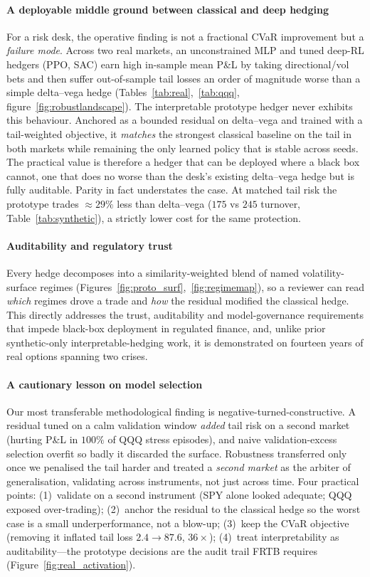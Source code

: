 \documentclass[sigconf,anonymous]{acmart}
\begin{document}
\paragraph{A deployable middle ground between classical and deep hedging} For a
risk desk, the operative finding is not a fractional CVaR improvement but a
\emph{failure mode}. Across two real markets, an unconstrained MLP and tuned deep-RL
hedgers (PPO, SAC) earn high in-sample mean P\&L by taking directional/vol bets and
then suffer out-of-sample tail losses an order of magnitude worse than a simple
delta--vega hedge (Tables~\ref{tab:real},~\ref{tab:qqq}, figure~\ref{fig:robustlandscape}).
The interpretable prototype hedger never exhibits this behaviour. Anchored as a
bounded residual on delta--vega and trained with a tail-weighted objective, it
\emph{matches} the strongest classical baseline on the tail in both markets while
remaining the only learned policy that is stable across seeds. The practical value is
therefore a hedger that can be deployed where a black box cannot, one that does no
worse than the desk's existing delta--vega hedge but is fully auditable. Parity in
fact understates the case. At matched tail risk the prototype trades ${\approx}29\%$
less than delta--vega ($175$ vs $245$ turnover, Table~\ref{tab:synthetic}), a strictly
lower cost for the same protection.

\paragraph{Auditability and regulatory trust} Every hedge decomposes into a
similarity-weighted blend of named volatility-surface regimes
(Figures~\ref{fig:proto_surf},~\ref{fig:regimemap}), so a reviewer
can read \emph{which} regimes drove a trade and \emph{how} the residual modified the
classical hedge. This directly addresses the trust, auditability and model-governance
requirements that impede black-box deployment in regulated finance, and, unlike prior
synthetic-only interpretable-hedging work, it is demonstrated on fourteen years of
real options spanning two crises.

\paragraph{A cautionary lesson on model selection} Our most transferable
methodological finding is negative-turned-constructive. A residual tuned on a calm
validation window \emph{added} tail risk on a second market (hurting P\&L in $100\%$
of QQQ stress episodes), and naive validation-excess selection overfit so badly it
discarded the surface. Robustness transferred only once we penalised the tail harder
and treated a \emph{second market} as the arbiter of generalisation, validating across
instruments, not just across time.  Four practical points:
(1)~validate on a second instrument (SPY alone looked adequate; QQQ exposed over-trading);
(2)~anchor the residual to the classical hedge so the worst case is a small underperformance,
not a blow-up; (3)~keep the CVaR objective (removing it inflated tail loss
$2.4\!\to\!87.6$, $36\times$); (4)~treat interpretability as auditability---the prototype
decisions are the audit trail FRTB requires (Figure~\ref{fig:real_activation}).
\end{document}
